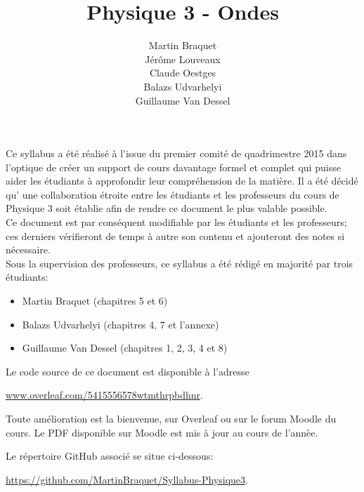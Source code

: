 \documentclass[a4paper,justified,openany]{tufte-book}
\begin{document}
	
	\title{Physique 3 - Ondes}
	\author{Martin Braquet\\Jérôme Louveaux\\Claude Oestges\\Balazs Udvarhelyi\\Guillaume Van Dessel}
	
	\newcommand{\monthyear}{%
		\ifcase\month\or January\or February\or March\or April\or May\or June\or
		July\or August\or September\or October\or November\or
		December\fi\space\number\year
	}
    
	\maketitle
	\vfill
	\begin{fullwidth}
		Ce syllabus a été réalisé à l'issue du premier comité de quadrimestre 2015 dans l'optique de créer un support de cours davantage formel et complet qui puisse aider les étudiants à approfondir leur compréhension de la matière. Il a été décidé qu' une collaboration étroite entre les étudiants et les professeurs du cours de Physique 3 soit établie afin de rendre ce document 
		le plus valable possible. \\
		Ce document est par conséquent modifiable par les étudiants et les professeurs; ces derniers vérifieront de temps à autre 
		son contenu et ajouteront des notes si nécessaire. \\
		Sous la supervision des professeurs, ce syllabus a été rédigé en majorité par trois étudiants: 
		\begin{itemize}
		 \item Martin Braquet (chapitres 5 et 6)
		 \item Balazs Udvarhelyi (chapitres 4, 7 et l'annexe)
		 \item Guillaume Van Dessel (chapitres 1, 2, 3, 4 et 8)
		\end{itemize}
	\end{fullwidth}
	\vspace{2cm}
	\begin{fullwidth}
        Le code source de ce document est disponible à l'adresse
		\begin{center}
            \url{www.overleaf.com/5415556578wtmthrpbdhnr}.
        \end{center}
		Toute amélioration est la bienvenue, sur Overleaf ou sur le forum Moodle du cours. Le PDF disponible sur Moodle est mis à jour au cours de l'annèe.
		
		Le répertoire GitHub associé se situe ci-dessous:
		\begin{center}
            \url{https://github.com/MartinBraquet/Syllabus-Physique3}.
        \end{center}
    \end{fullwidth}
\end{document}
